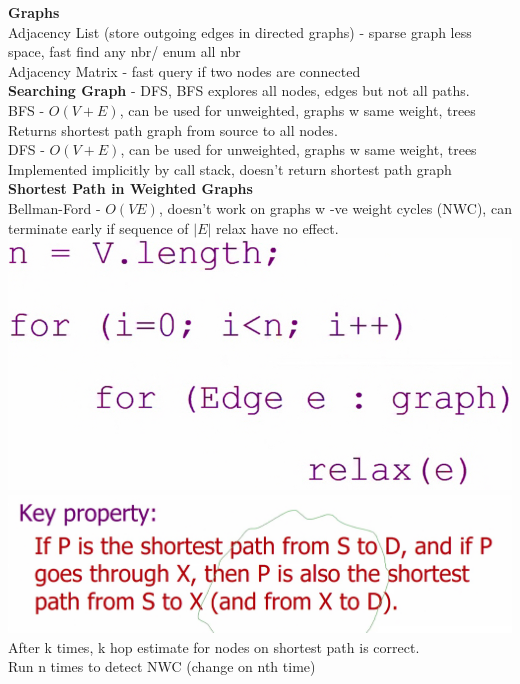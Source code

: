 \documentclass[10pt, a4paper]{article}
\begin{document}
\begin{multicols*}{3}
		{\normalsize\textbf{Graphs}}\\
		Adjacency List (store outgoing edges in directed graphs) - sparse graph less space, fast find any nbr/ enum all nbr\\
		Adjacency Matrix - fast query if two nodes are connected\\
		\textbf{Searching Graph} - DFS, BFS explores all nodes, edges but not all paths.\\
		BFS - $O(V + E)$, can be used for unweighted, graphs w same weight, trees\\
		Returns shortest path graph from source to all nodes.\\
		DFS - $O(V + E)$, can be used for unweighted, graphs w same weight, trees\\
		Implemented implicitly by call stack, doesn't return shortest path graph\\
		\textbf{Shortest Path in Weighted Graphs}\\
		Bellman-Ford - $O(VE)$, doesn't work on graphs w -ve weight cycles (NWC), can terminate early if sequence of $|E|$ relax have no effect.\\
		\includegraphics[scale=.12]{./assets/BF}
		\includegraphics[scale=.1]{./assets/BF2}
		After k times, k hop estimate for nodes on shortest path is correct.\\
		Run n times to detect NWC (change on nth time)\\ 

\end{multicols*}
\end{document}
